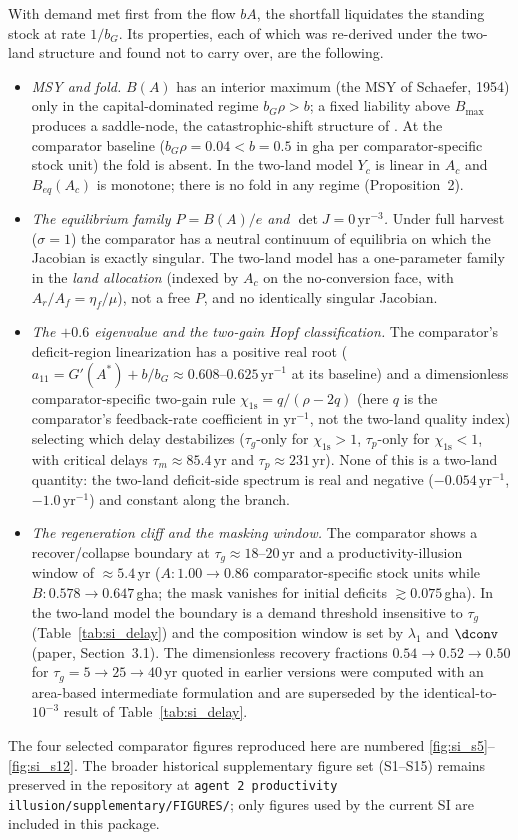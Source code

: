 With demand met first from the flow $bA$, the shortfall liquidates the standing stock at rate $1/b_G$. Its properties, each of which was re-derived under the two-land structure and found not to carry over, are the following.
\begin{itemize}[leftmargin=1.5em]
\item \emph{MSY and fold.} $B(A)$ has an interior maximum (the MSY of Schaefer, 1954) only in the capital-dominated regime $b_G\rho>b$; a fixed liability above $B_{\max}$ produces a saddle-node, the catastrophic-shift structure of \citet{Scheffer2001}. At the comparator baseline ($b_G\rho=0.04<b=0.5$ in gha per comparator-specific stock unit) the fold is absent. In the two-land model $Y_c$ is linear in $A_c$ and $B_{eq}(A_c)$ is monotone; there is no fold in any regime (Proposition~2).
\item \emph{The equilibrium family $P=B(A)/e$ and $\det J=0\,\mathrm{yr}^{-3}$.} Under full harvest ($\sigma=1$) the comparator has a neutral continuum of equilibria on which the Jacobian is exactly singular. The two-land model has a one-parameter family in the \emph{land allocation} (indexed by $A_c$ on the no-conversion face, with $A_r/A_f=\eta_f/\mu$), not a free $P$, and no identically singular Jacobian.
\item \emph{The $+0.6$ eigenvalue and the two-gain Hopf classification.} The comparator's deficit-region linearization has a positive real root ($a_{11}=G'(A^*)+b/b_G\approx0.608$--$0.625$\,yr$^{-1}$ at its baseline) and a dimensionless comparator-specific two-gain rule $\chi_{\mathrm{1s}}=q/(\rho-2q)$ (here $q$ is the comparator's feedback-rate coefficient in yr$^{-1}$, not the two-land quality index) selecting which delay destabilizes ($\tau_g$-only for $\chi_{\mathrm{1s}}>1$, $\tau_p$-only for $\chi_{\mathrm{1s}}<1$, with critical delays $\tau_m\approx85.4$\,yr and $\tau_p\approx231$\,yr). None of this is a two-land quantity: the two-land deficit-side spectrum is real and negative ($-0.054\,\mathrm{yr}^{-1}$, $-1.0\,\mathrm{yr}^{-1}$) and constant along the branch.
\item \emph{The regeneration cliff and the masking window.} The comparator shows a recover/collapse boundary at $\tau_g\approx18$--$20$\,yr and a productivity-illusion window of $\approx5.4$\,yr ($A:1.00\to0.86$ comparator-specific stock units while $B:0.578\to0.647$\,gha; the mask vanishes for initial deficits $\gtrsim0.075$\,gha). In the two-land model the boundary is a demand threshold insensitive to $\tau_g$ (Table~\ref{tab:si_delay}) and the composition window is set by $\lambda_1$ and $\dconv$ (paper, Section~3.1). The dimensionless recovery fractions $0.54\to0.52\to0.50$ for $\tau_g=5\to25\to40$\,yr quoted in earlier versions were computed with an area-based intermediate formulation and are superseded by the identical-to-$10^{-3}$ result of Table~\ref{tab:si_delay}.
\end{itemize}
The four selected comparator figures reproduced here are numbered \ref{fig:si_s5}--\ref{fig:si_s12}. The broader historical supplementary figure set (S1--S15) remains preserved in the repository at \texttt{agent 2 productivity illusion/supplementary/FIGURES/}; only figures used by the current SI are included in this package.

